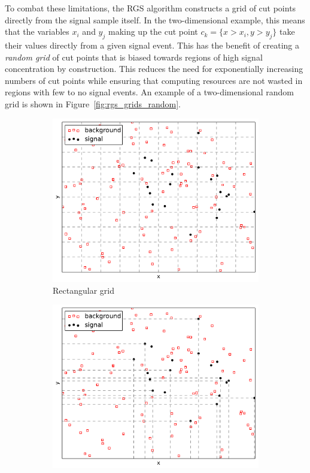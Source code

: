 To combat these limitations, the RGS algorithm constructs a grid of cut points directly from the signal sample itself.
In the two-dimensional example, this means that the variables $x_i$ and $y_j$ making up the cut point $c_k = \{x > x_i, y > y_j\}$ take their values directly from a given signal event.
This has the benefit of creating a \emph{random grid} of cut points that is biased towards regions of high signal concentration by construction.
This reduces the need for exponentially increasing numbers of cut points while ensuring that computing resources are not wasted in regions with few to no signal events.
An example of a two-dimensional random grid is shown in Figure~\ref{fig:rgs_grids_random}.

\begin{figure}[htp]
  \centering
  \begin{subfigure}[b]{.48\textwidth}
    \includegraphics[width=\textwidth]{figs/ssww_upgrade/rgs/square_grid-cropped}
    \caption{Rectangular grid}
    \label{fig:rgs_grids_rectangular}
  \end{subfigure}
  \begin{subfigure}[b]{.48\textwidth}
    \includegraphics[width=\textwidth]{figs/ssww_upgrade/rgs/random_grid-cropped}

\end{subfigure}
\end{figure}
